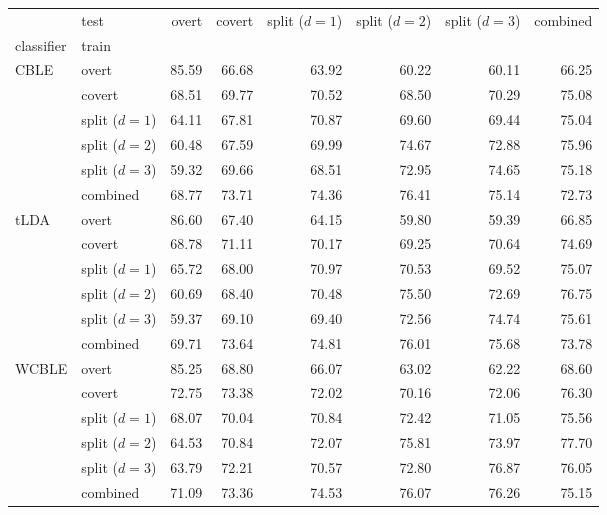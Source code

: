 \sffamily
\small
\begin{tabularx}{\textwidth}{@{}XXrrrrrr@{}}
\toprule
  & test & overt & covert & \makecell[r]{split \\ ($d=1$)} & \makecell[r]{split
  \\($d=2$)} & \makecell[r]{split \\ ($d=3$)} & combined \\
classifier & train &  &  &  &  &  &  \\
\midrule
\multirow[t]{6}{*}{CBLE} & overt & 85.59 & 66.68 & 63.92 & 60.22 & 60.11 & 66.25 \\
 & covert & 68.51 & 69.77 & 70.52 & 68.50 & 70.29 & 75.08 \\
 & split ($d=1$) & 64.11 & 67.81 & 70.87 & 69.60 & 69.44 & 75.04 \\
 & split ($d=2$) & 60.48 & 67.59 & 69.99 & 74.67 & 72.88 & 75.96 \\
 & split ($d=3$) & 59.32 & 69.66 & 68.51 & 72.95 & 74.65 & 75.18 \\
 & combined & 68.77 & 73.71 & 74.36 & 76.41 & 75.14 & 72.73 \\
\midrule
\multirow[t]{6}{*}{tLDA} & overt & 86.60 & 67.40 & 64.15 & 59.80 & 59.39 & 66.85 \\
 & covert & 68.78 & 71.11 & 70.17 & 69.25 & 70.64 & 74.69 \\
 & split ($d=1$) & 65.72 & 68.00 & 70.97 & 70.53 & 69.52 & 75.07 \\
 & split ($d=2$) & 60.69 & 68.40 & 70.48 & 75.50 & 72.69 & 76.75 \\
 & split ($d=3$) & 59.37 & 69.10 & 69.40 & 72.56 & 74.74 & 75.61 \\
 & combined & 69.71 & 73.64 & 74.81 & 76.01 & 75.68 & 73.78 \\
\midrule
\multirow[t]{6}{*}{WCBLE} & overt & 85.25 & 68.80 & 66.07 & 63.02 & 62.22 & 68.60 \\
 & covert & 72.75 & 73.38 & 72.02 & 70.16 & 72.06 & 76.30 \\
 & split ($d=1$) & 68.07 & 70.04 & 70.84 & 72.42 & 71.05 & 75.56 \\
 & split ($d=2$) & 64.53 & 70.84 & 72.07 & 75.81 & 73.97 & 77.70 \\
 & split ($d=3$) & 63.79 & 72.21 & 70.57 & 72.80 & 76.87 & 76.05 \\
 & combined & 71.09 & 73.36 & 74.53 & 76.07 & 76.26 & 75.15 \\
\bottomrule
\end{tabularx}
